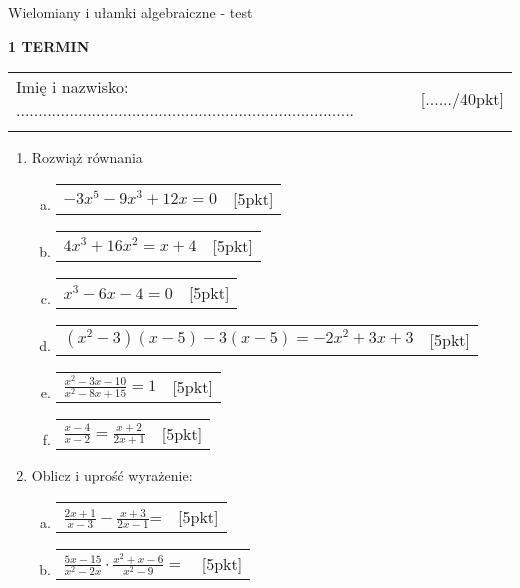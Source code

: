 \documentclass[12pt,a4paper]{article}
\begin{document}
	\begin{center}
		\LARGE Wielomiany i ułamki algebraiczne - test
	\end{center}
	
	\begin{flushright}
		\textbf{1 TERMIN}
	\end{flushright}
	\begin{tabular}{p{13cm} r}
		Imię i nazwisko: ............................................................................
		&[....../40pkt]\\ 
		\vspace{0.5cm}
	\end{tabular}
	\begin{enumerate}[1.]	\large
		\item  Rozwiąż równania
		\begin{enumerate}[a)]
			\item \begin{tabular}{p{13cm} r}
				$-3x^5-9x^3+12x=0$ &[5pkt]\\ 
			\end{tabular}
			\item \begin{tabular}{p{13cm} r}
				$4x^3+16x^2=x+4$ &[5pkt]\\ 
			\end{tabular}
			\item  \begin{tabular}{p{13cm} r}
				$x^3-6x-4=0$&[5pkt]\\ 
			\end{tabular}
			\item  \begin{tabular}{p{13cm} r}
				$(x^2-3)(x-5)-3(x-5)=-2x^2+3x+3$&[5pkt]\\ 
			\end{tabular}
			\item  \begin{tabular}{p{13cm} r}
				$\frac{x^2-3x-10}{x^2-8x+15}=1$&[5pkt]\\ 
			\end{tabular}
			\item  \begin{tabular}{p{13cm} r}
				$\frac{x-4}{x-2}=\frac{x+2}{2x+1}$&[5pkt]\\ 
			\end{tabular}
		\end{enumerate}
		
		\item Oblicz i uprość wyrażenie:
		
		\begin{enumerate}[a)]
			\item  \begin{tabular}{p{13cm} r}
				$\frac{2x+1}{x-3}-\frac{x+3}{2x-1}$=	&[5pkt]\\ 
			\end{tabular}
			\item  \begin{tabular}{p{13cm} r}
				$\frac{5x-15}{x^2-2x}\cdot\frac{x^2+x-6}{x^2-9}=$&[5pkt]\\ 
			\end{tabular}
		\end{enumerate}
		
		
		
		
		
	\end{enumerate}
	
\end{document}
